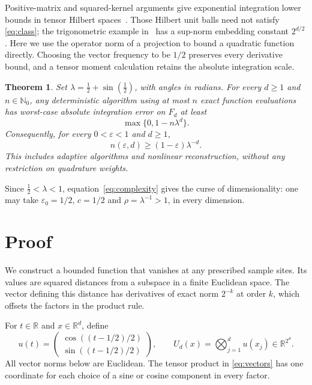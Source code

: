 \documentclass[11pt]{article}
\newtheorem{theorem}{Theorem}
\newcommand{\R}{\mathbb R}
\newcommand{\N}{\mathbb N}
\begin{document}
Positive-matrix and squared-kernel arguments give exponential integration
lower bounds in tensor Hilbert spaces~\cite{Vybiral,HinrichsEtAl}.
Those Hilbert unit balls need not satisfy \eqref{eq:class}; the
trigonometric example in~\cite[Section 3.1]{HinrichsEtAl} has a sup-norm
embedding constant $2^{d/2}$. Here we use the operator norm of a projection
to bound a quadratic function directly. Choosing the vector frequency to
be $1/2$ preserves every derivative bound, and a tensor moment calculation
retains the absolute integration scale.

\begin{theorem}\label{thm:main}
Set $\lambda=\tfrac12+\sin(\tfrac12)$, with angles in radians. For every
$d\ge1$ and $n\in\N_0$, any deterministic algorithm using at most $n$
exact function evaluations has worst-case absolute integration error on
$F_d$ at least
\begin{equation}\label{eq:error}
 \max\{0,1-n\lambda^d\}.
\end{equation}
Consequently, for every $0<\varepsilon<1$ and $d\ge1$,
\begin{equation}\label{eq:complexity}
 n(\varepsilon,d)\ge (1-\varepsilon)\lambda^{-d}.
\end{equation}
This includes adaptive algorithms and nonlinear reconstruction, without
any restriction on quadrature weights.
\end{theorem}

Since $\tfrac12<\lambda<1$, equation~\eqref{eq:complexity} gives the curse
of dimensionality: one may take $\varepsilon_0=1/2$, $c=1/2$ and
$\rho=\lambda^{-1}>1$, in every dimension.

\section{Proof}

We construct a bounded function that vanishes at any prescribed sample
sites. Its values are squared distances from a subspace in a finite
Euclidean space. The vector defining this distance has derivatives of
exact norm $2^{-k}$ at order $k$, which offsets the factors in the product rule.

For $t\in\R$ and $x\in\R^d$, define
\begin{equation}\label{eq:vectors}
 u(t)=\begin{pmatrix}\cos((t-1/2)/2)\\\sin((t-1/2)/2)\end{pmatrix},
 \qquad U_d(x)=\bigotimes_{j=1}^d u(x_j)\in\R^{2^d}.
\end{equation}
All vector norms below are Euclidean. The tensor product in
\eqref{eq:vectors} has one coordinate for each choice of a sine or cosine
component in every factor.
\end{document}
